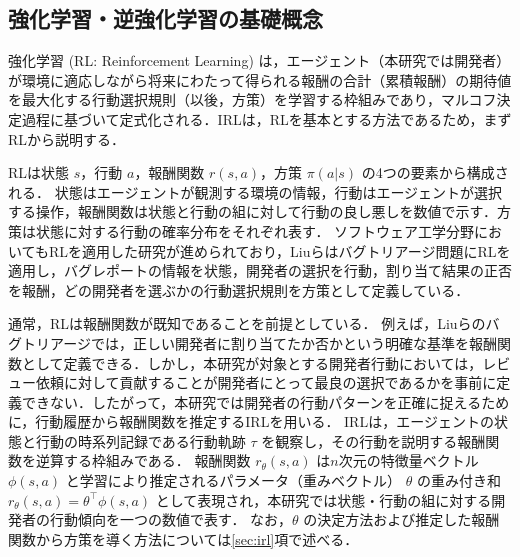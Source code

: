 \documentclass[submit]{ipsj}
\begin{document}




\vspace{-4mm}
\subsection{強化学習・逆強化学習の基礎概念}

強化学習 (RL: Reinforcement Learning) は，エージェント（本研究では開発者）が環境に適応しながら将来にわたって得られる報酬の合計（累積報酬）の期待値を最大化する行動選択規則（以後，方策）を学習する枠組みであり，マルコフ決定過程に基づいて定式化される．IRLは，RLを基本とする方法であるため，まずRLから説明する．

RLは状態 $s$，行動 $a$，報酬関数 $r(s, a)$，方策 $\pi(a|s)$ の4つの要素から構成される．
状態はエージェントが観測する環境の情報，行動はエージェントが選択する操作，報酬関数は状態と行動の組に対して行動の良し悪しを数値で示す．方策は状態に対する行動の確率分布をそれぞれ表す．
ソフトウェア工学分野においてもRLを適用した研究が進められており，Liuらはバグトリアージ問題にRLを適用し，バグレポートの情報を状態，開発者の選択を行動，割り当て結果の正否を報酬，どの開発者を選ぶかの行動選択規則を方策として定義している\cite{RL}．

通常，RLは報酬関数が既知であることを前提としている．
例えば，Liuらのバグトリアージでは，正しい開発者に割り当てたか否かという明確な基準を報酬関数として定義できる．しかし，本研究が対象とする開発者行動においては，レビュー依頼に対して貢献することが開発者にとって最良の選択であるかを事前に定義できない．したがって，本研究では開発者の行動パターンを正確に捉えるために，行動履歴から報酬関数を推定するIRLを用いる．
IRLは，エージェントの状態と行動の時系列記録である行動軌跡 $\tau$ を観察し，その行動を説明する報酬関数を逆算する枠組みである．
報酬関数 $r_\theta(s,a)$ は$n$次元の特徴量ベクトル $\phi(s, a)$ と学習により推定されるパラメータ（重みベクトル） $\theta$ の重み付き和$r_\theta(s,a) = \theta^\top \phi(s,a)$ として表現され，本研究では状態・行動の組に対する開発者の行動傾向を一つの数値で表す．
なお，$\theta$ の決定方法および推定した報酬関数から方策を導く方法については\ref{sec:irl}項で述べる．
\end{document}
